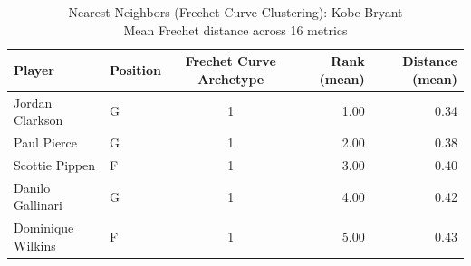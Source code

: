 \begin{table}[t]
\caption*{
{\fontsize{20}{25} Nearest Neighbors (Frechet Curve Clustering): Kobe Bryant\fontsize{12}{15}\selectfont } \\ 
{\fontsize{14}{17}\selectfont  Mean Frechet distance across 16 metrics\fontsize{12}{15}\selectfont }
} 
\fontsize{12.0pt}{14.0pt}\selectfont
\begin{tabular*}{\linewidth}{@{\extracolsep{\fill}}llcrr}
\toprule
Player & Position & Frechet Curve Archetype & Rank (mean) & Distance (mean) \\ 
\midrule\addlinespace[2.5pt]
Jordan Clarkson & G & 1 & 1.00 & 0.34 \\ 
Paul Pierce & G & 1 & 2.00 & 0.38 \\ 
Scottie Pippen & F & 1 & 3.00 & 0.40 \\ 
Danilo Gallinari & G & 1 & 4.00 & 0.42 \\ 
Dominique Wilkins & F & 1 & 5.00 & 0.43 \\ 
\bottomrule
\end{tabular*}
\end{table}

